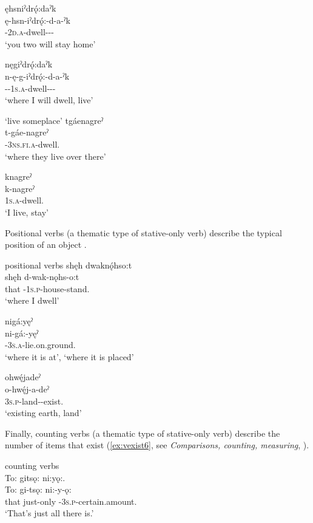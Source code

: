 \ex ęhsniˀdrǫ́:daˀk\\
\gll ę-hsn-iˀdrǫ́:-d-a-ˀk\\
 \textsc{\future-2d.a}-dwell-\textsc{\causative-\joinerA-\modalizer}\\
\glt `you two will stay home'

\ex nęgiˀdrǫ́:daˀk\\
\gll n-ę-g-iˀdrǫ́:-d-a-ˀk\\
\textsc{\partitive-\future-1s.a}-dwell-\textsc{\causative-\joinerA-\modalizer}\\
    \glt ‘where I will dwell, live’
\z
\z

\ea\label{ex:vexist4}  ‘live someplace’
\ea tgáenagreˀ\\
\gll t-gáe-nagreˀ\\
 {\cislocative}-\textsc{3ns.fi.a}-dwell.{\stative}\\
\glt `where they live over there'

\ex knagreˀ\\
\gll k-nagreˀ\\
 \textsc{1s.a}-dwell.{\stative}\\
\glt `I live, stay'
\z
\z

Positional verbs (a thematic type of stative-only verb) describe the typical position of an object .

\ea\label{ex:vexist5} positional verbs
\ea shęh dwaknǫ́hso:t  \\
\gll shęh d-wak-nǫhs-o:t\\
that  {\cislocative}-\textsc{1s.p}-house-stand.{\stative}\\
\glt ‘where I dwell’

\ex  nigá:yęˀ \\
\gll ni-gá:-yęˀ\\
 {\partitive}-\textsc{3s.a}-lie.on.ground.{\stative}\\
\glt ‘where it is at’, `where it is placed'

\ex ohwę́jadeˀ\\
\gll o-hwę́j-a-deˀ\\
 \textsc{3s.p}-land-{\joinerA}-exist.{\stative}\\
\glt `existing earth, land'
\z
\z

Finally, counting verbs (a thematic type of stative-only verb) describe the number of items that exist (\ref{ex:vexist6}, see \textit{Comparisons, counting, measuring}, ).

\ea\label{ex:vexist6} counting verbs\\
To: gitsǫ: ni:yǫ:.  \\
\gll To: gi-tsǫ: ni:-y-ǫ:\\
that just-only {\partitive}-\textsc{3s.p}-certain.amount.{\stative}\\
\glt ‘That’s just all there is.’
\z

